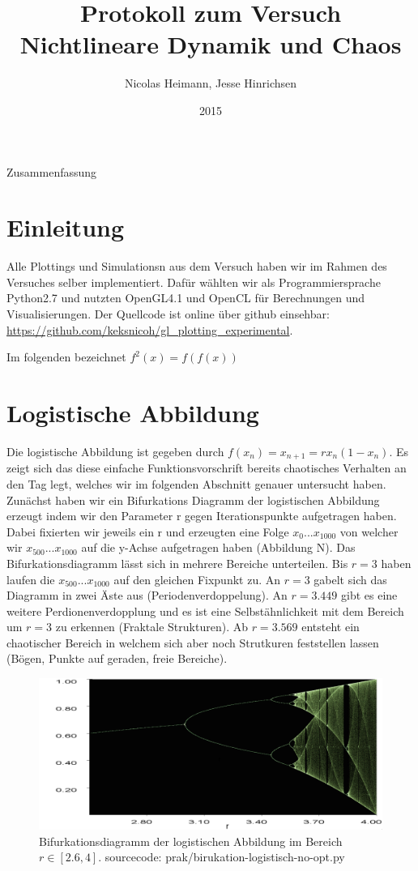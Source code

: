 \documentclass{scrartcl}
\title{Protokoll zum Versuch Nichtlineare Dynamik und Chaos}
\author{Nicolas Heimann, Jesse Hinrichsen}
\affil{\textit{Universität Hamburg}}
\date{2015}
\begin{document}
\maketitle




\begin{description}
\item Zusammenfassung
\end{description}


\section{  Einleitung  }
Alle Plottings und Simulationsn aus dem Versuch haben wir im Rahmen des Versuches selber implementiert. Dafür wählten wir als Programmiersprache Python2.7 und nutzten OpenGL4.1 und OpenCL für Berechnungen und Visualisierungen. Der Quellcode ist online über github einsehbar: \url{https://github.com/keksnicoh/gl_plotting_experimental}.  

Im folgenden bezeichnet $f^2(x) = f(f(x))$

\section{Logistische Abbildung}
Die logistische Abbildung ist gegeben durch $f(x_n)=x_{n+1}=rx_n(1-x_n)$. Es zeigt sich das diese einfache Funktionsvorschrift 
bereits chaotisches Verhalten an den Tag legt, welches wir im folgenden Abschnitt genauer untersucht haben. Zunächst haben 
wir ein Bifurkations Diagramm der logistischen Abbildung erzeugt indem wir den Parameter r gegen Iterationspunkte aufgetragen haben. Dabei fixierten wir jeweils ein r und erzeugten eine Folge $x_0 ... x_{1000}$ von welcher wir $x_{500} ... x_{1000}$ auf die y-Achse aufgetragen haben (Abbildung N).
Das Bifurkationsdiagramm lässt sich in mehrere Bereiche unterteilen. Bis $r=3$ haben laufen die $x_{500}...x_{1000}$ auf den gleichen Fixpunkt zu. An $r=3$ gabelt sich das Diagramm in zwei Äste aus (Periodenverdoppelung). An $r=3.449$ gibt es eine weitere Perdionenverdopplung und es ist eine Selbstähnlichkeit mit dem Bereich um $r=3$ zu erkennen (Fraktale Strukturen). Ab $r=3.569$ entsteht ein chaotischer Bereich in welchem sich aber noch Strutkuren feststellen lassen (Bögen, Punkte auf geraden, freie Bereiche).
\begin{figure}
	\centering
	\includegraphics[scale=0.25]{bifurkation}
	\caption{Bifurkationsdiagramm der logistischen Abbildung im Bereich $r\in[2.6,4]$. sourcecode: prak/birukation-logistisch-no-opt.py}
	\label{bifurkation}
\end{figure}
\end{document}
